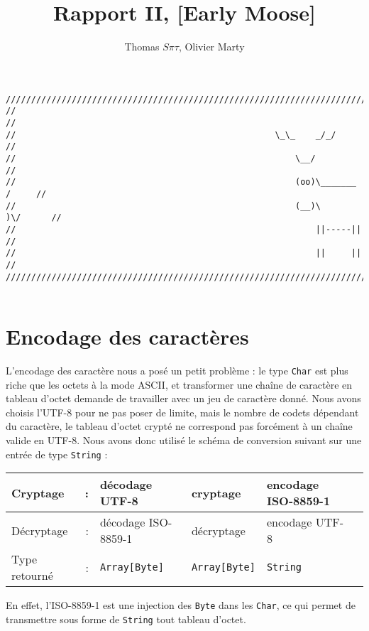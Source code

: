 \documentclass[11pt]{article} %
\title{Rapport II,  [Early Moose]}
\author{Thomas $S\pi\tau$, Olivier Marty}
\begin{document}
\maketitle

\begin{verbatim}
////////////////////////////////////////////////////////////////////////////////
//                                                                            //
//                                                   \_\_    _/_/             //
//                                                       \__/                 //
//                                                       (oo)\_______   /     //
//                                                       (__)\       )\/      //
//                                                           ||-----||        //
//                                                           ||     ||        //
////////////////////////////////////////////////////////////////////////////////  


\end{verbatim}

\section{Encodage des caractères}

L'encodage des caractère nous a posé un petit problème : le type \texttt{Char} est plus riche que les octets à la mode ASCII, et transformer une chaîne de caractère en tableau d'octet demande de travailler avec un jeu de caractère donné. Nous avons choisis l'UTF-8 pour ne pas poser de limite, mais le nombre de codets dépendant du caractère, le tableau d'octet crypté ne correspond pas forcément à un chaîne valide en UTF-8.
Nous avons donc utilisé le schéma de conversion suivant sur une entrée de type \texttt{String} :
\begin{center}
\begin{tabular}{|lr|l|l|l|l|}
  \hline
  Cryptage & : & décodage UTF-8 & cryptage & encodage ISO-8859-1 \\
  \hline
  Décryptage & : & décodage ISO-8859-1 & décryptage & encodage UTF-8 \\
  \hline
  Type retourné & : & \texttt{Array[Byte]} & \texttt{Array[Byte]} & \texttt{String}\\
  \hline
\end{tabular}
\end{center}


En effet, l'ISO-8859-1 est une injection des \texttt{Byte} dans les \texttt{Char}, ce qui permet de transmettre sous forme de \texttt{String} tout tableau d'octet.
\end{document}
